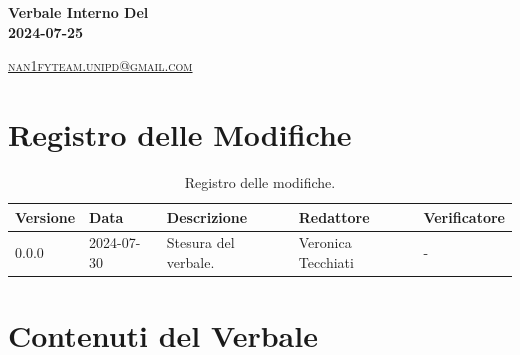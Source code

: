 \documentclass[8pt]{article}
\begin{document}
\begin{titlepage}
\begin{minipage}[t]{0.47\textwidth}
{		}
		\vspace{4mm}\vspace{4mm}
	\end{minipage}
	\vspace{4cm}
	\begin{center}
		\begin{flushright}
			{\fontsize{30pt}{52pt}\selectfont \textbf{Verbale Interno Del\\2024-07-25\\}} %
		\end{flushright}
		\vspace{3cm}
	\end{center}
	\vspace{8.5 cm}
	{\small \textsc{\href{mailto: nan1fyteam.unipd@gmail.com}{nan1fyteam.unipd@gmail.com}}}
\end{titlepage}
\pagestyle{mystyle}
\section*{Registro delle Modifiche}
\begin{table}[ht!]	
	\centering
	\begin{tabular}{p{1.2cm} p{2cm} p{5cm} p{3cm} p{3cm}}
		\toprule
		\textbf{Versione}& \textbf{Data} & \textbf{Descrizione} & \textbf{Redattore} & \textbf{Verificatore} \\
		\midrule
			0.0.0 & 2024-07-30 & Stesura del verbale. & Veronica Tecchiati & -
 			\\ %

		\bottomrule
	\end{tabular}
	\caption{Registro delle modifiche.}
	\label{table:Registro delle modifiche}
\end{table}
\newpage
\tableofcontents
\clearpage
\newpage
\justifying
\section{Contenuti del Verbale}
\end{document}
